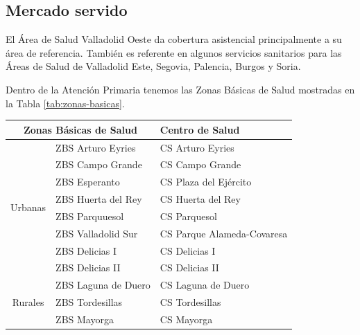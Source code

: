 \subsection{Mercado servido}

El Área de Salud Valladolid Oeste da cobertura asistencial principalmente a su área de referencia.
También es referente en algunos servicios sanitarios para las Áreas de Salud de Valladolid Este, Segovia, Palencia, Burgos y Soria.

Dentro de la Atención Primaria tenemos las Zonas Básicas de Salud mostradas en la Tabla \ref{tab:zonas-basicas}.

\begin{table}[H]
    \centering
    \begin{tabular}{cll}
        \toprule
        \multicolumn{2}{c}{Zonas   Básicas de Salud} & Centro de Salud                                      \\
        \midrule
        \multirow{8}{*}{Urbanas}                     & ZBS Arturo Eyries       & CS Arturo Eyries           \\
                                                     & ZBS Campo Grande        & CS Campo Grande            \\
                                                     & ZBS Esperanto           & CS Plaza del Ejército      \\
                                                     & ZBS Huerta del Rey      & CS Huerta del Rey          \\
                                                     & ZBS Parquuesol          & CS Parquesol               \\
                                                     & ZBS Valladolid Sur      & CS Parque Alameda-Covaresa \\
                                                     & ZBS Delicias I          & CS Delicias I              \\
                                                     & ZBS Delicias II         & CS Delicias II             \\
        \midrule
        \multirow{11}{*}{Rurales}                    & ZBS Laguna de Duero     & CS Laguna de Duero         \\
                                                     & ZBS Tordesillas         & CS Tordesillas             \\
                                                     & ZBS Mayorga             & CS Mayorga                 \\

\end{tabular}
\end{table}
